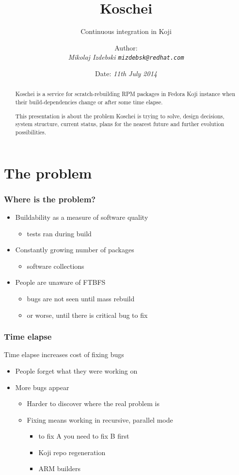 \documentclass[pdftex,unicode,xcolor=table]{beamer}
\title{Koschei}
\subtitle{Continuous integration in Koji}
\author{Author: \\
  \em{Mikolaj Izdebski}
  \tt{mizdebsk@redhat.com}}
\date{Date: \em{11th July 2014}}
\begin{document}
\begin{rhbg}
  \begin{frame}
    \titlepage
    \begin{abstract}
Koschei is a service for scratch-rebuilding RPM packages in Fedora Koji
instance when their build-dependencies change or after some time elapse.

This presentation is about the problem Koschei is trying to solve, design decisions,
system structure, current status, plans for the nearest future and further
evolution possibilities.
    \end{abstract}
  \end{frame}
\end{rhbg}


\section{The problem}
\Large
\begin{frame}
  \frametitle{Where is the problem?}
  \begin{itemize}
  \item Buildability as a measure of software quality
    \begin{itemize}
      \item tests ran during build
    \end{itemize}
  \item Constantly growing number of packages
    \begin{itemize}
      \item software collections
    \end{itemize}
  \item People are unaware of FTBFS
    \begin{itemize}
      \item bugs are not seen until mass rebuild
      \item or worse, until there is critical bug to fix
    \end{itemize}
  \end{itemize}
\end{frame}

\begin{frame}
  \frametitle{Time elapse}
  Time elapse increases cost of fixing bugs
  \begin{itemize}
  \item People forget what they were working on
  \item More bugs appear
    \begin{itemize}
      \item Harder to discover where the real problem is
      \item Fixing means working in recursive, parallel mode
      \begin{itemize}
        \item to fix A you need to fix B first
        \item Koji repo regeneration
        \item ARM builders
      \end{itemize}
    \end{itemize}
  \end{itemize}
\end{frame}
\end{document}
